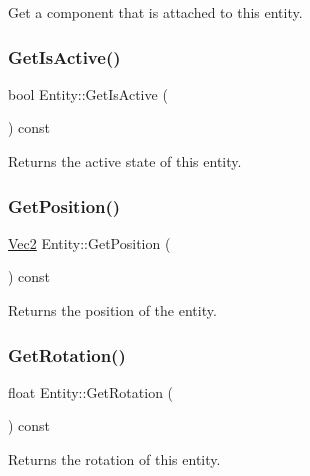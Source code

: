 Get a component that is attached to this entity. \mbox{\label{class_entity_a98ee6f61ed846d661e5e660d9f4d7e10}} 
\subsubsection{\texorpdfstring{Get\+Is\+Active()}{GetIsActive()}}
{\footnotesize\ttfamily bool Entity\+::\+Get\+Is\+Active (\begin{DoxyParamCaption}{ }\end{DoxyParamCaption}) const\hspace{0.3cm}{\ttfamily [inline]}}

Returns the active state of this entity. \mbox{\label{class_entity_aed198c25368025ba9ff9768f17f19e9e}} 
\subsubsection{\texorpdfstring{Get\+Position()}{GetPosition()}}
{\footnotesize\ttfamily \mbox{\hyperlink{struct_vec2}{Vec2}} Entity\+::\+Get\+Position (\begin{DoxyParamCaption}{ }\end{DoxyParamCaption}) const\hspace{0.3cm}{\ttfamily [inline]}}

Returns the position of the entity. \mbox{\label{class_entity_ab5e5cf79cf2ce961c23061798488bcc4}} 
\subsubsection{\texorpdfstring{Get\+Rotation()}{GetRotation()}}
{\footnotesize\ttfamily float Entity\+::\+Get\+Rotation (\begin{DoxyParamCaption}{ }\end{DoxyParamCaption}) const\hspace{0.3cm}{\ttfamily [inline]}}

Returns the rotation of this entity. \mbox{\label{class_entity_a56a2203cb76f5a4cd8c16f0f8ce18b57}} 
